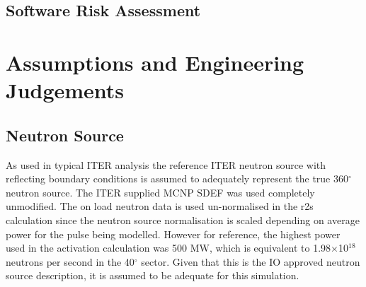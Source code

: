 \documentclass[12pt]{article}
\begin{document}
\subsection{Software Risk Assessment}
\clearpage
\newpage
\section{Assumptions and Engineering Judgements}
\subsection{Neutron Source}
As used in typical ITER analysis the reference ITER neutron source with
reflecting boundary conditions is assumed to adequately represent the
true 360$^{\circ}$ neutron source. The ITER supplied MCNP SDEF was used
completely unmodified. The on load neutron data is used un-normalised
in the \gls{r2s} calculation since the neutron source normalisation is scaled
depending on average power for the pulse being modelled. However for reference,
the highest power used in the activation calculation was 500 MW, which is
equivalent to 1.98$\times$10$^{18}$ neutrons per second in the 40$^{\circ}$
sector. Given that this is the IO approved neutron source description, it is
assumed to be adequate for this simulation.
\end{document}
